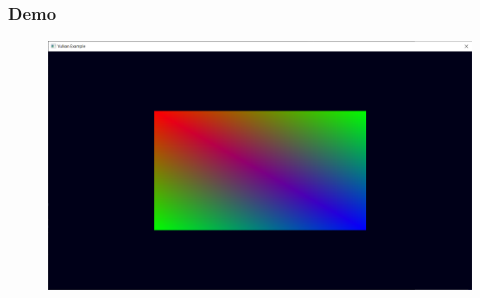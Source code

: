 \begin{frame}
\frametitle{Demo}

\begin{figure}[ht]
    \centering
    \includegraphics[scale=0.25]{images/SlidesVertices/RenderQuad.png}
\end{figure}

\end{frame}
